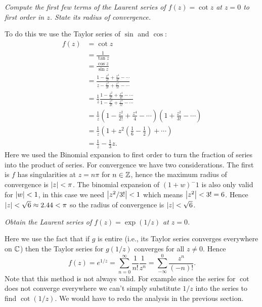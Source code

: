 \documentclass{article}
\begin{document}
    \begin{example}
        \emph{Compute the first few terms of the Laurent series of \(f(z) = \cot z\) at \(z = 0\) to first order in \(z\). State its radius of convergence.}
        
        To do this we use the Taylor series of \(\sin\) and \(\cos\):
        \begin{align*}
            f(z) &= \cot z\\
            &= \frac{1}{\tan z}\\
            &= \frac{\cos z}{\sin z}\\
            &= \frac{1 - \frac{z^2}{2!} + \frac{z^4}{4!} - \dotsb}{z - \frac{z^3}{3!} + \frac{z^5}{5!} - \dotsb}\\
            &= \frac{1}{z}\frac{1 - \frac{z^2}{2!} + \frac{z^4}{4!} - \dotsb}{1 - \frac{z^2}{3!} + \frac{z^4}{5!} - \dotsb}\\
            &= \frac{1}{z} \left( 1 - \frac{z^2}{2!} + \frac{z^4}{4} - \dotsb \right) \left( 1 + \frac{z^2}{3!} - \dotsb \right)\\
            &= \frac{1}{z} \left( 1 + z^2\left( \frac{1}{6} - \frac{1}{2} \right) + \dotsb \right)\\
            &= \frac{1}{z} - \frac{1}{3}z.
        \end{align*}
        Here we used the Binomial expansion to first order to turn the fraction of series into the product of series.
        For convergence we have two considerations.
        The first is \(f\) has singularities at \(z = n\pi\) for \(n\in\mathbb{Z}\), hence the maximum radius of convergence is \(\abs{z} < \pi\).
        The binomial expansion of \((1 + w)^-1\) is also only valid for \(\abs{w} < 1\), in this case we need \(\abs{z^2/3!} < 1\) which means \(\abs{z^2} < 3! = 6\).
        Hence \(\abs{z} < \sqrt{6} \approx 2.44 < \pi\) so the radius of convergence is \(\abs{z} < \sqrt{6}\).
    \end{example}
    \begin{example}
        \emph{Obtain the Laurent series of \(f(z) = \exp(1/z)\) at \(z = 0\).}
        
        Here we use the fact that if \(g\) is entire (i.e., its Taylor series converges everywhere on \(\mathbb{C}\)) then the Taylor series for \(g(1/z)\) converges for all \(z \ne 0\).
        Hence
        \[f(z) = e^{1/z} = \sum_{n=0}^{\infty}\frac{1}{n!}\frac{1}{z^n} = \sum_{-\infty}^{0} \frac{z^n}{(-n)!}.\]
        Note that this method is not always valid.
        For example since the series for \(\cot\) does not converge everywhere we can't simply substitute \(1/z\) into the series to find \(\cot(1/z)\).
        We would have to redo the analysis in the previous section.
    \end{example}
\end{document}
